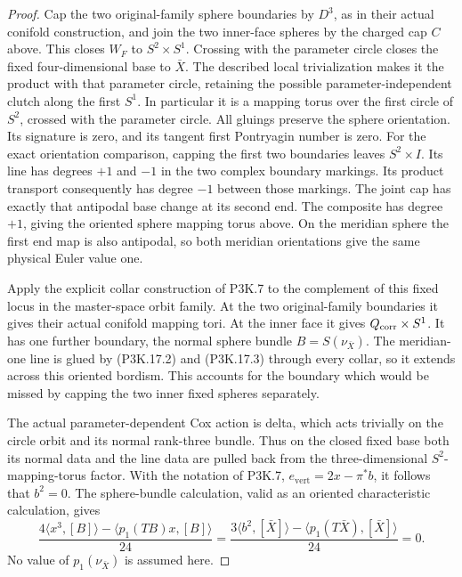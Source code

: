 \begin{proof}
Cap the two original-family sphere boundaries by \(D^3\),
as in their actual conifold construction, and join the two
inner-face spheres by the charged cap \(C\) above.  This
closes \(W_F\) to \(S^2\times S^1\).  Crossing with
the parameter circle closes the fixed four-dimensional base
to \(\bar X\).  The described local trivialization makes
it the product with that parameter circle, retaining the
possible parameter-independent clutch along the first
\(S^1\).  In particular it is a mapping torus over the
first circle of \(S^2\), crossed with the parameter circle.
All gluings preserve the sphere orientation.  Its signature
is zero, and its tangent first Pontryagin number is zero.
For the exact orientation comparison, capping the first two
boundaries leaves \(S^2\times I\).  Its line has degrees
\(+1\) and \(-1\) in the two complex boundary markings.
Its product transport consequently has degree \(-1\)
between those markings.  The joint cap has exactly that
antipodal base change at its second end.  The composite has
degree \(+1\), giving the oriented sphere mapping torus
above.  On the meridian sphere the first end map is also
antipodal, so both meridian orientations give the same
physical Euler value one.

Apply the explicit collar construction of P3K.7 to the
complement of this fixed locus in the master-space orbit
family.  At the two original-family boundaries it gives
their actual conifold mapping tori.  At the inner face it
gives \(Q_{\rm corr}\times S^1\).  It has one further
boundary, the normal sphere bundle \(B=S(\nu_{\bar X})\).
The meridian-one line is glued by (P3K.17.2) and (P3K.17.3)
through every collar, so it extends across this oriented
bordism.  This accounts for the boundary which would be
missed by capping the two inner fixed spheres separately.

The actual parameter-dependent Cox action is delta, which
acts trivially on the circle orbit and its normal rank-three
bundle.  Thus on the closed fixed base both its normal data
and the line data are pulled back from the three-dimensional
\(S^2\)-mapping-torus factor.  With the notation of P3K.7,
\(e_{\mathrm{vert}}=2x-\pi^*b\), it follows that
\(b^2=0\).  The sphere-bundle calculation, valid as an
oriented characteristic calculation, gives
\[
       \frac{4\langle x^3,[B]\rangle
                  -\langle p_1(TB)x,[B]\rangle}{24}
       =\frac{3\langle b^2,[\bar X]\rangle
                    -\langle p_1(T\bar X),[\bar X]\rangle}{24}
       =0.                                             \tag{P3K.17.5}
\]
No value of \(p_1(\nu_{\bar X})\) is assumed here.


\end{proof}

